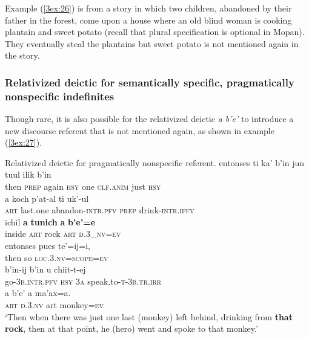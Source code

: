 \documentclass[output=paper]{langsci/langscibook}
\begin{document}
{
Example (\ref{3ex:26}) is from a story in which two children, abandoned by their father in the forest, come upon a house where an old blind woman is cooking plantain and sweet potato (recall that plural specification is optional in Mopan).  They eventually steal the plantains but sweet potato is not mentioned again in the story.
}

\subsubsection{Relativized deictic for semantically specific, pragmatically nonspecific indefinites}\label{3sec:342}

Though rare, it is also possible for the relativized deictic {\emph{a b'e'}} to introduce a new discourse referent that is not mentioned again, as shown in example (\ref{3ex:27}).

\begin{exe}
\ex\label{3ex:27}
Relativized deictic for pragmatically nonspecific referent. 
\exi{}
\gll 	entonses 	ti 			ka'		b'in 		jun 	tuul 			ilik 	b'in  \\
	then 		{\textsc{prep}} 	again	{\textsc{hsy}} 	one 	{\textsc{clf.anim}} 	just	{\textsc{hsy}} \\
\glt 
\exi{}
\gll	a 	koch		p'at-al				ti			uk'-ul \\		 
	{\textsc{art}}	last.one	abandon-{\textsc{intr.pfv}}	{\textsc{prep}}		drink-{\textsc{intr.ipfv}} \\
\glt 
\exi{}
\gll	ichil		{\textbf{a}}	{\textbf{tunich}}	{\textbf{a}}	{\textbf{b'e'=e}} \\
	inside	{\textsc{art}}	rock			{\textsc{art}}	{\textsc{d.3\_nv=ev}} \\
\glt 
\exi{}
\gll	entonses	pues		te'=ij=i,  \\
	then		so		{\textsc{loc.3.nv=scope=ev}} \\
\glt 
\exi{}
\gll	b'in-ij				b'in			u		chiit-t-ej \\
	go-{\textsc{3b.intr.pfv}}	{\textsc{hsy}}		{\textsc{3a}}	speak.to-{\textsc{t-3b.tr.irr}} \\
\glt 
\exi{}
\gll	a 	b'e'			a 	ma'ax=a. \\
	{\textsc{art}} 	{\textsc{d.3.nv}}	art	monkey={\textsc{ev}} \\
\glt	`Then when there was just one last (monkey) left behind, drinking from {\textbf{that rock}}, then at that point, he (hero) went and spoke to that monkey.'
\end{exe}
\end{document}
